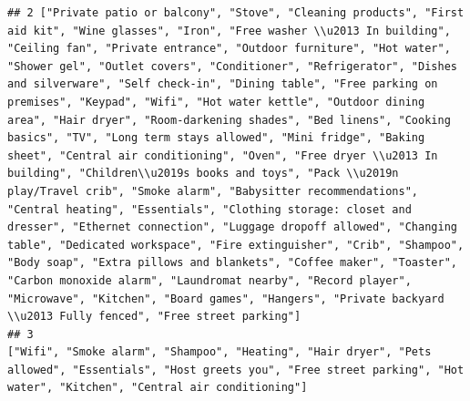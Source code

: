 \documentclass[
]{article}
\begin{document}
\begin{verbatim}
## 2 ["Private patio or balcony", "Stove", "Cleaning products", "First aid kit", "Wine glasses", "Iron", "Free washer \\u2013 In building", "Ceiling fan", "Private entrance", "Outdoor furniture", "Hot water", "Shower gel", "Outlet covers", "Conditioner", "Refrigerator", "Dishes and silverware", "Self check-in", "Dining table", "Free parking on premises", "Keypad", "Wifi", "Hot water kettle", "Outdoor dining area", "Hair dryer", "Room-darkening shades", "Bed linens", "Cooking basics", "TV", "Long term stays allowed", "Mini fridge", "Baking sheet", "Central air conditioning", "Oven", "Free dryer \\u2013 In building", "Children\\u2019s books and toys", "Pack \\u2019n play/Travel crib", "Smoke alarm", "Babysitter recommendations", "Central heating", "Essentials", "Clothing storage: closet and dresser", "Ethernet connection", "Luggage dropoff allowed", "Changing table", "Dedicated workspace", "Fire extinguisher", "Crib", "Shampoo", "Body soap", "Extra pillows and blankets", "Coffee maker", "Toaster", "Carbon monoxide alarm", "Laundromat nearby", "Record player", "Microwave", "Kitchen", "Board games", "Hangers", "Private backyard \\u2013 Fully fenced", "Free street parking"]
## 3                                                                                                                                                                                                                                                                                                                                                                                                                                                                                                                                                                                                                                                                                                                                                                                                                                                                                                                                                                                                                                        ["Wifi", "Smoke alarm", "Shampoo", "Heating", "Hair dryer", "Pets allowed", "Essentials", "Host greets you", "Free street parking", "Hot water", "Kitchen", "Central air conditioning"]

\end{verbatim}
\end{document}
